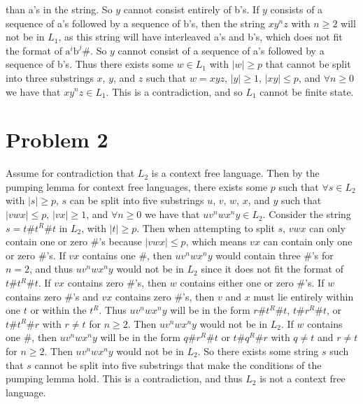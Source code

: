 \documentclass[12pt]{article}
\begin{document}
than a's in the string. So \(y\) cannot consist entirely of b's. If \(y\) consists of a sequence of a's followed by a sequence of b's, then the string \(xy^nz\)
with \(n\geq 2\) will not be in \(L_1\), as this string will have interleaved a's and b's, which does not fit the format of \(\text{a}^i\text{b}^j\text{\#}\).
So \(y\) cannot consist of a sequence of a's followed by a sequence of b's. Thus there exists some \(w \in L_1\) with \(|w|\geq p\) that cannot be split into
three substrings \(x\), \(y\), and \(z\) such that \(w=xyz\), \(|y|\geq 1\), \(|xy|\leq p\), and \(\forall n\geq 0\) we have that \(xy^nz\in L_1\). This is a
contradiction, and so \(L_1\) cannot be finite state.

\section*{Problem 2}

Assume for contradiction that \(L_2\) is a context free language. Then by the pumping lemma for context free languages, there exists some
\(p\) such that \(\forall s\in L_2\) with \(|s|\geq p\), \(s\) can be split into five substrings \(u\), \(v\), \(w\), \(x\), and \(y\) such that
\(|vwx|\leq p\), \(|vx|\geq 1\), and \(\forall n\geq 0\) we have that \(uv^nwx^ny\in L_2\). Consider the string \(s=t\#t^R\#t\) in \(L_2\), with \(|t|\geq p\).
Then when attempting to split \(s\), \(vwx\) can only contain one or zero \#'s because \(|vwx|\leq p\), which means \(vx\) can contain only one or zero \#'s.
If \(vx\) contains one \#, then \(uv^nwx^ny\) would contain three \#'s for \(n=2\), and thus \(uv^nwx^ny\) would not be in \(L_2\) since it does not fit the
format of \(t\#t^R\#t\). If \(vx\) contains zero \#'s, then \(w\) contains either one or zero \#'s. If \(w\) contains zero \#'s and \(vx\) contains zero \#'s,
then \(v\) and \(x\) must lie entirely within one \(t\) or within the \(t^R\). Thus \(uv^nwx^ny\) will be in the form \(r\#t^R\#t\), \(t\#r^R\#t\), or \(t\#t^R\#r\)
with \(r\neq t\) for \(n\geq 2\). Then \(uv^nwx^ny\) would not be in \(L_2\). If \(w\) contains one \#, then \(uv^nwx^ny\) will be in the form \(q\#r^R\#t\) or
\(t\#q^R\#r\) with \(q\neq t\) and \(r\neq t\) for \(n\geq 2\). Then \(uv^nwx^ny\) would not be in \(L_2\). So there exists some string \(s\) such that \(s\) cannot be
split into five substrings that make the conditions of the pumping lemma hold. This is a contradiction, and thus \(L_2\) is not a context free language.
\end{document}
